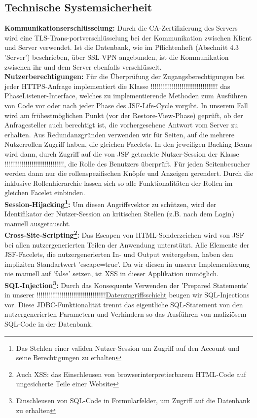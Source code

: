 \documentclass{article}
\begin{document}
\subsection{Technische Systemsicherheit}
\noindent \textbf{Kommunikationserschlüsselung:} Durch die CA-Zertifizierung des Servers wird eine TLS-Trans-portverschlüsselung bei der Kommunikation zwischen Klient und Server verwendet. Ist die Datenbank, wie im Pflichtenheft (Abschnitt 4.3  'Server') beschrieben, über SSL-VPN angebunden, ist die Kommunikation zwischen ihr und dem Server ebenfalls verschlüsselt. \\
\textbf{Nutzerberechtigungen:} Für die Überprüfung der Zugangsberechtigungen bei jeder HTTPS-Anfrage implementiert die Klasse !!!!!!!!!!!!!!!!!!!!!!!!!!!!!!!!!!!\hyperlink{}{} das PhaseListener-Interface, welches zu implementierende Methoden zum Ausführen von Code vor oder nach jeder Phase des JSF-Life-Cycle vorgibt. In unserem Fall wird am frühestmöglichen Punkt (vor der Restore-View-Phase) geprüft, ob der Anfragesteller auch berechtigt ist, die vorhergesehene Antwort vom Server zu erhalten. Aus Redundanzgründen verwenden wir für Seiten, auf die mehrere Nutzerrollen Zugriff haben, die gleichen Facelets. In den jeweiligen Backing-Beans wird dann, durch Zugriff auf die von JSF getrackte Nutzer-Session der Klasse  !!!!!!!!!!!!!!!!!!!!!!!!!!!!!!!\hyperlink{}{}, die Rolle des Benutzers überprüft. Für jeden Seitenbesucher werden dann nur die rollenspezifischen Knöpfe und Anzeigen gerendert. Durch die inklusive Rollenhierarchie lassen sich so alle Funktionalitäten der Rollen im gleichen Facelet einbinden.\\
\textbf{Session-Hijacking\footnote{Das Stehlen einer validen Nutzer-Session um Zugriff auf den Account und seine Berechtigungen zu erhalten}:} Um diesen Angriffsvektor zu schützen, wird der Identifikator der Nutzer-Session an kritischen Stellen (z.B. nach dem Login) manuell ausgetauscht. \\
\textbf{Cross-Site-Scripting\footnote{Auch XSS: das Einschleusen von browserinterpretierbarem HTML-Code auf ungesicherte Teile einer Website}:} Das Escapen von HTML-Sonderzeichen wird von JSF bei allen nutzergenerierten Teilen der Anwendung unterstützt. Alle Elemente der JSF-Facelets, die nutzergenerierten In- und Output weitergeben, haben den impliziten Standartwert 'escape=true'. Da wir diesen in unserer Implementierung nie manuell auf 'false' setzen, ist XSS in dieser Applikation unmöglich. \\
\textbf{SQL-Injection\footnote{Einschleusen von SQL-Code in Formularfelder, um Zugriff auf die Datenbank zu erhalten}:} Durch das Konsequente Verwenden der 'Prepared Statements' in unserer !!!!!!!!!!!!!!!!!!!!!!!!!!!!!!!!!!!!\hyperlink{}{Datenzugriffsschicht} beugen wir SQL-Injections vor. Diese JDBC-Funktionalität trennt das eigentliche SQL-Statement von den nutzergenerierten Parametern und Verhindern so das Ausführen von maliziösem SQL-Code in der Datenbank. \\
\end{document}
